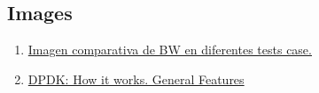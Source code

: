 \documentclass[12pt]{article}
\begin{document}
	\subsection{Images}
	\begin{enumerate}
		\item 
		\label{bib:img1}\href{https://www.accton.com/Technology-Brief/intel-dpdk-performance-on-the-sau5081i-server/}{Imagen comparativa de BW en diferentes tests case.}
		
		\item
		\label{bib:img2} \href{https://blog.selectel.com/introduction-dpdk-architecture-principles/}{DPDK: How it works. General Features}
		
		
	\end{enumerate}
	
\end{document}

